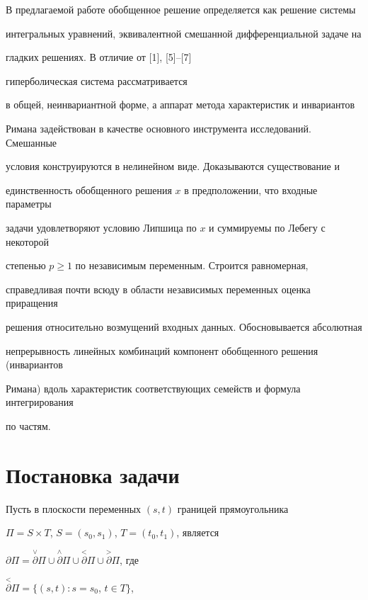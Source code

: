 В предлагаемой работе обобщенное решение определяется как решение системы 


интегральных уравнений, эквивалентной смешанной дифференциальной задаче на 


гладких решениях. В отличие от [1], [5]--[7] 


гиперболическая система рассматривается 


в общей, неинвариантной форме, а аппарат метода характеристик и инвариантов 


Римана задействован в качестве основного инструмента исследований. Смешанные 


условия конструируются в нелинейном виде. Доказываются существование и 


единственность обобщенного решения $x$ в предположении, что входные параметры 


задачи удовлетворяют условию Липшица по $x$ и суммируемы по Лебегу с некоторой 


степенью $p \geq 1$ по независимым переменным. Строится равномерная, 


справедливая  почти всюду в области независимых переменных оценка приращения


решения относительно возмущений входных данных. Обосновывается абсолютная


непрерывность линейных комбинаций компонент обобщенного решения (инвариантов


Римана) вдоль характеристик соответствующих семейств и формула интегрирования


по частям.








\section{Постановка задачи}





Пусть в плоскости переменных $(s,t)$ границей прямоугольника 


${\Pi} =S \times T$, $S=(s_0, s_1)$, $T=(t_0,t_1)$, является


$\partial {\Pi}=\overset{\vee}{\partial}{}{\Pi} \cup 


\overset{\wedge}{\partial}{}{\Pi} \cup \overset{<}{\partial}{}{\Pi}


\cup \overset{>}{\partial}{\Pi}$, где 


$\overset{<}{\partial}{}{\Pi}=\{(s,t): s=s_0$, $t \in T \}$,


